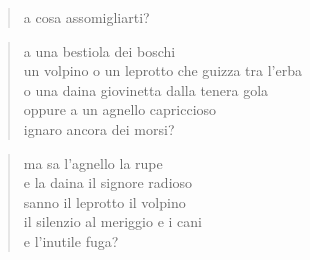 \clearpage


\begin{verse}
    a cosa assomigliarti?
\end{verse}

\begin{verse}
    a una bestiola dei boschi\\
    un volpino o un leprotto che guizza tra l'erba\\
    o una daina giovinetta dalla tenera gola\\
    oppure a un agnello capriccioso\\
    ignaro ancora dei morsi?
\end{verse}

\begin{verse}
    ma sa l'agnello la rupe\\
    e la daina il signore radioso\\
    sanno il leprotto il volpino\\
    il silenzio al meriggio e i cani\\
    e l'inutile fuga?
\end{verse}
